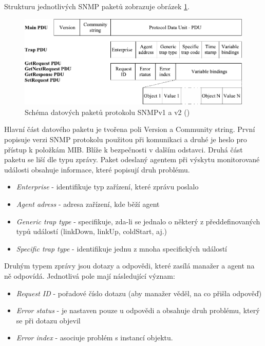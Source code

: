 Strukturu jednotlivých SNMP paketů zobrazuje obrázek \ref{obr_snmp3}.

\begin{figure}[htp]
	\begin{center}
		\includegraphics{obrazky/02_snmp_pdu.pdf}
		\caption{Schéma datových paketů protokolu SNMPv1 a v2 (\cite{macejko_dipl})}
		\label{obr_snmp3}
	\end{center}
\end{figure}

Hlavní část datového paketu je tvořena poli Version a Community string. První popisuje verzi SNMP protokolu použitou při komunikaci a druhé je heslo pro přístup
k položkám MIB. Blíže k bezpečnosti v dalším odstavci. Druhá část paketu se liší dle typu zprávy. Paket odeslaný agentem při výskytu monitorované události obsahuje
informace, které popisují druh problému.
\begin{itemize}
	\item \textit{Enterprise} - identifikuje typ zařízení, které zprávu poslalo
	\item \textit{Agent adress} - adresa zařízení, kde běží agent
	\item \textit{Generic trap type} - specifikuje, zda-li se jednalo o některý z předdefinovaných typů událostí (linkDown, linkUp, coldStart, aj.)
	\item \textit{Specific trap type} - identifikuje jednu z mnoha specifických událostí
\end{itemize}

Druhým typem zprávy jsou dotazy a odpovědi, které zasílá manažer a agent na ně odpovídá. Jednotlivá pole mají následující význam:
\begin{itemize}
	\item \textit{Request ID} - pořadové číslo dotazu (aby manažer věděl, na co přišla odpověď)
	\item \textit{Error status} - je nastaven pouze u odpovědi a obsahuje druh problému, který se při dotazu objevil
	\item \textit{Error index} - asociuje problém s instancí objektu.
\end{itemize}

